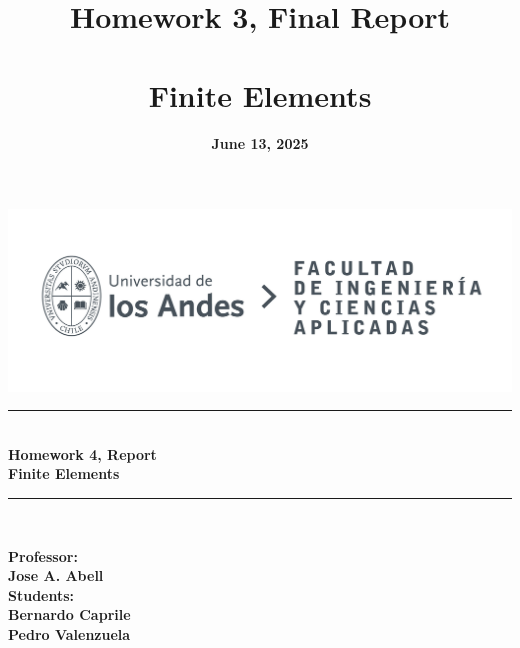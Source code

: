 \documentclass[12pt]{article}
\title{\textbf{Homework 3, Final Report\\ \vspace{0.5cm} \\ Finite Elements}}
\date{\textbf{June 13, 2025}}
\begin{document}
\makeatletter
\begin{titlepage}
    \begin{center}
        \vspace{2cm}
        \includegraphics[width=0.8\linewidth]{LOGO_UNIVERSIDAD.jpg}\\[10ex]
        
        \rule{\textwidth}{1pt} \\[2ex]
        {\LARGE \textbf{Homework 4, Report\\ \vspace{0.5cm} Finite Elements}}\\[2ex]
        \rule{\textwidth}{1pt} \\[10ex]

        \vfill

        \begin{flushright}
            \textbf{Professor:\\
             Jose A. Abell} \\[0.3cm]
            \textbf{Students: \\
            Bernardo Caprile\\
            Pedro Valenzuela} \\[0.3cm]
        \end{flushright}
        
        \vspace*{1cm}
        {\normalsize \@date}
    \end{center}
\end{titlepage}
\makeatother


\pagestyle{fancy}
\fancyhf{}
\rhead{\shorttitle}


\rfoot{\thepage}
\renewcommand{\footrulewidth}{0.5pt}

\tableofcontents
\end{document}
